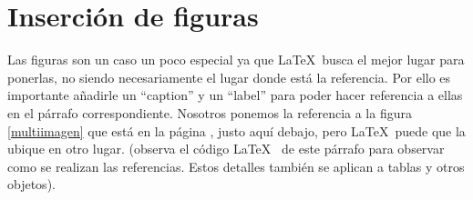\newpage
\section{Inserción de figuras}


Las figuras son un caso un poco especial ya que \LaTeX~busca el mejor lugar para ponerlas, no siendo necesariamente el lugar donde está la referencia. Por ello es importante añadirle un ``caption'' y un ``label'' para poder hacer referencia a ellas en el párrafo correspondiente. Nosotros ponemos la referencia a la figura \ref{multiimagen} que está en la página \pageref{multiimagen}, justo aquí debajo, pero \LaTeX ~puede que la ubique en otro lugar. (observa el código \LaTeX~ de este párrafo para observar como se realizan las referencias. Estos detalles también se aplican a tablas y otros objetos).



